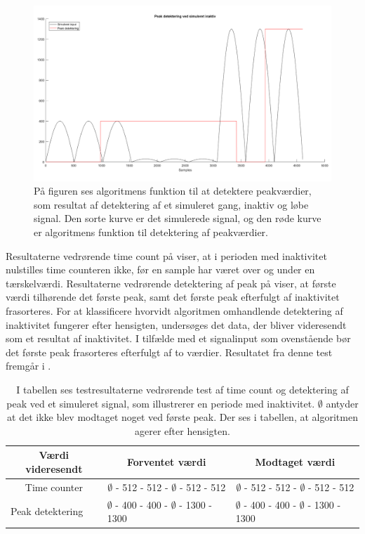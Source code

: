 \begin{figure}[H]
	\centering
	\includegraphics[scale=0.35]{figures/cDesign/test_peak_inaktiv.png}
	\caption{På figuren ses algoritmens funktion til at detektere peakværdier, som resultat af detektering af et simuleret gang, inaktiv og løbe signal. Den sorte kurve er det simulerede signal, og den røde kurve er algoritmens funktion til detektering af peakværdier. }
	\label{fig:test_inaktiv_peak}
\end{figure}
Resultaterne vedrørende time count på  viser, at i perioden med inaktivitet nulstilles time counteren ikke, før en sample har været over og under en tærskelværdi. Resultaterne vedrørende detektering af peak på  viser, at første værdi tilhørende det første peak, samt det første peak efterfulgt af inaktivitet frasorteres. For at klassificere hvorvidt algoritmen omhandlende detektering af inaktivitet fungerer efter hensigten, undersøges det data, der bliver videresendt som et resultat af inaktivitet. I tilfælde med et signalinput som ovenstående bør det første peak frasorteres efterfulgt af to værdier. Resultatet fra denne test fremgår i . %
\begin{table}[H]
	\centering
	\begin{tabular}{ccc}
		\hline
		\rowcolor[HTML]{C0C0C0} 
		Værdi videresendt & Forventet værdi & Modtaget værdi \\ \hline
		Time counter & $\emptyset$ - 512 - 512 - $\emptyset$ - 512 - 512 & $\emptyset$ - 512 - 512 - $\emptyset$ - 512 - 512 \\ \hline
		\multicolumn{1}{l}{Peak detektering} &     \multicolumn{1}{l}{$\emptyset$ - 400 - 400 - $\emptyset$ - 1300 - 1300}     &     \multicolumn{1}{l}{$\emptyset$ - 400 - 400 - $\emptyset$ - 1300 - 1300} \\ \hline
	\end{tabular}
	\caption{I tabellen ses testresultaterne vedrørende test af time count og detektering af peak ved et simuleret signal, som illustrerer en periode med inaktivitet. $\emptyset$ antyder at det ikke blev modtaget noget ved første peak. Der ses i tabellen, at algoritmen agerer efter hensigten.}
	\label{tab:test_inaktiv}
\end{table}\vspace{-0.5cm}
